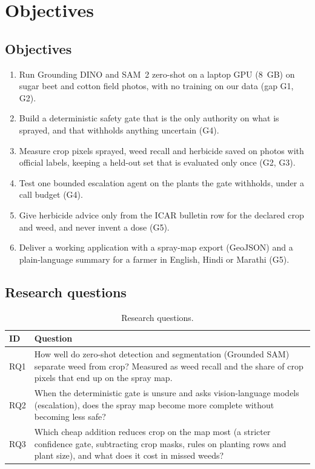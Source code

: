 \chapter{Objectives}\label{ch:objectives}

\section{Objectives}
\begin{enumerate}[label=\textbf{O\arabic*.}]
\item Run Grounding DINO and SAM~2 zero-shot on a laptop GPU (8~GB) on sugar beet and cotton field
  photos, with no training on our data (gap G1, G2).
\item Build a deterministic safety gate that is the only authority on what is sprayed, and that
  withholds anything uncertain (G4).
\item Measure crop pixels sprayed, weed recall and herbicide saved on photos with official labels,
  keeping a held-out set that is evaluated only once (G2, G3).
\item Test one bounded escalation agent on the plants the gate withholds, under a call budget (G4).
\item Give herbicide advice only from the ICAR bulletin row for the declared crop and weed, and never
  invent a dose (G5).
\item Deliver a working application with a spray-map export (GeoJSON) and a plain-language summary
  for a farmer in English, Hindi or Marathi (G5).
\end{enumerate}

\section{Research questions}
\begin{table}[H]
\centering
\caption{Research questions.}\label{tab:rq}
\begin{tabularx}{\textwidth}{@{}lY@{}}
\toprule
\textbf{ID} & \textbf{Question}\\
\midrule
RQ1 & How well do zero-shot detection and segmentation (Grounded SAM) separate weed from crop? Measured as weed recall and the share of crop pixels that end up on the spray map.\\
RQ2 & When the deterministic gate is unsure and asks vision-language models (escalation), does the spray map become more complete without becoming less safe?\\
RQ3 & Which cheap addition reduces crop on the map most (a stricter confidence gate, subtracting crop masks, rules on planting rows and plant size), and what does it cost in missed weeds?\\
\bottomrule
\end{tabularx}
\end{table}

